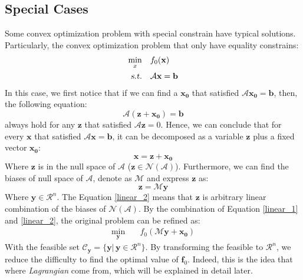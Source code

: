 \documentclass[10pt,a4paper]{article}
\begin{document}
\subsection{Special Cases}
Some convex optimization problem with special constrain have typical solutions. Particularly, the convex optimization problem that only have equality constrains:
\begin{equation*}
	\begin{aligned}
		\displaystyle\min_{x} \quad & f_{0}(\mathbf{x}) \\
		\textsl{s.t.} \quad & \mathcal{A} \mathbf{x} = \mathbf{b}
	\end{aligned}
\end{equation*}
In this case, we first notice that if we can find a $\mathbf{x_{0}}$ that satisfied $\mathcal{A} \mathbf{x_{0}} = \mathbf{b}$, then, the following equation:
\begin{equation}
	\mathcal{A}(\mathbf{z} + \mathbf{x_{0}}) = \mathbf{b}
\end{equation}
always hold for any $\mathbf{z}$ that satisfied $\mathcal{A} \mathbf{z} = 0$. Hence, we can conclude that for every $\mathbf{x}$ that satisfied $\mathcal{A} \mathbf{x} = \mathbf{b}$, it can be decomposed as a variable $\mathbf{z}$ plus a fixed vector $\mathbf{x_{0}}$:
\begin{equation}
	\mathbf{x} = \mathbf{z} + \mathbf{x_{0}}
	\label{linear_1}
\end{equation}
Where $\mathbf{z}$ is in the null space of $\mathcal{A}$ ($\mathbf{z} \in \mathcal{N}(\mathcal{A})$). Furthermore, we can find the biases of null space of $\mathcal{A}$, denote as $\mathcal{M}$ and express $\mathbf{z}$ as:
\begin{equation}
	\mathbf{z} = \mathcal{M} \mathbf{y}
	\label{linear_2}
\end{equation}
Where $\mathbf{y} \in \mathcal{R}^{n}$. The Equation \ref{linear_2} means that $\mathbf{z}$ is arbitrary linear combination of the biases of $\mathcal{N}(\mathcal{A})$. By the combination of Equation \ref{linear_1} and \ref{linear_2}, the original problem can be refined as:
\begin{equation*}
	\begin{aligned}
		\displaystyle \min_{\mathbf{y}} \quad & f_{0}(\mathcal{M} \mathbf{y} + \mathbf{x_{0}})
	\end{aligned}
\end{equation*}
With the feasible set $\mathcal{C}_{\mathbf{y}} = \{ \mathbf{y} |\, \mathbf{y} \in \mathcal{R}^{n} \}$. By transforming the feasible to $\mathcal{R}^{n}$, we reduce the difficulty to find the optimal value of $\mathbf{f}_{0}$. Indeed, this is the idea that where \textit{Lagrangian} come from, which will be explained in detail later.
\end{document}
